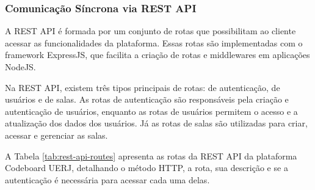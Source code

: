 \subsubsection{Comunicação Síncrona via REST API}

A REST API é formada por um conjunto de rotas que possibilitam ao cliente acessar as funcionalidades da plataforma. Essas rotas são implementadas com o framework ExpressJS, que facilita a criação de rotas e middlewares em aplicações NodeJS.

Na REST API, existem três tipos principais de rotas: de autenticação, de usuários e de salas. As rotas de autenticação são responsáveis pela criação e autenticação de usuários, enquanto as rotas de usuários permitem o acesso e a atualização dos dados dos usuários. Já as rotas de salas são utilizadas para criar, acessar e gerenciar as salas.

A Tabela \ref{tab:rest-api-routes} apresenta as rotas da REST API da plataforma Codeboard UERJ, detalhando o método HTTP, a rota, sua descrição e se a autenticação é necessária para acessar cada uma delas.

